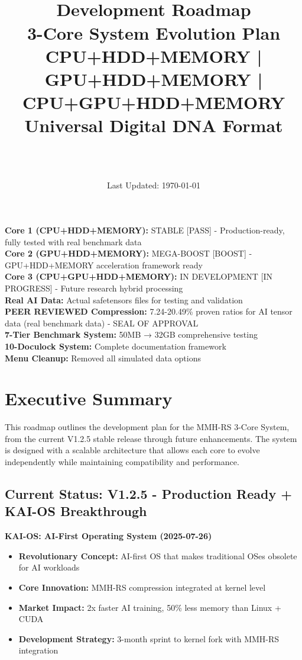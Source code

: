 \documentclass[12pt,a4paper]{article}
\title{\Huge\textbf{\project\ \version}\\[0.5cm]
\Large\textbf{Development Roadmap}\\[0.3cm]
\large 3-Core System Evolution Plan\\[0.5cm]
\large CPU+HDD+MEMORY | GPU+HDD+MEMORY | CPU+GPU+HDD+MEMORY\\[0.3cm]
\large Universal Digital DNA Format}
\author{\Large\authorname\\[0.2cm]\email\\[0.2cm]\github}
\date{\large Last Updated: \today}
\begin{document}
\maketitle
\thispagestyle{empty}

\begin{tcolorbox}[colback=blue!10,colframe=blue!50,title=\textbf{V1.2.5 - 3-Core System - DEVELOPMENT ROADMAP}]
\textbf{Core 1 (CPU+HDD+MEMORY):} STABLE [PASS] - Production-ready, fully tested with real benchmark data\\
\textbf{Core 2 (GPU+HDD+MEMORY):} MEGA-BOOST [BOOST] - GPU+HDD+MEMORY acceleration framework ready\\
\textbf{Core 3 (CPU+GPU+HDD+MEMORY):} IN DEVELOPMENT [IN PROGRESS] - Future research hybrid processing\\
\textbf{Real AI Data:} Actual safetensors files for testing and validation\\
\textbf{PEER REVIEWED Compression:} 7.24-20.49\% proven ratios for AI tensor data (real benchmark data) - \checkmark SEAL OF APPROVAL\\
\textbf{7-Tier Benchmark System:} 50MB → 32GB comprehensive testing\\
\textbf{10-Doculock System:} Complete documentation framework\\
\textbf{Menu Cleanup:} Removed all simulated data options
\end{tcolorbox}

\tableofcontents
\newpage

\section{Executive Summary}

This roadmap outlines the development plan for the MMH-RS 3-Core System, from the current V1.2.5 stable release through future enhancements. The system is designed with a scalable architecture that allows each core to evolve independently while maintaining compatibility and performance.

\subsection{Current Status: V1.2.5 - Production Ready + KAI-OS Breakthrough}

\textbf{KAI-OS: AI-First Operating System (2025-07-26)}
\begin{itemize}
    \item \textbf{Revolutionary Concept:} AI-first OS that makes traditional OSes obsolete for AI workloads
    \item \textbf{Core Innovation:} MMH-RS compression integrated at kernel level
    \item \textbf{Market Impact:} 2x faster AI training, 50\% less memory than Linux + CUDA
    \item \textbf{Development Strategy:} 3-month sprint to kernel fork with MMH-RS integration
\end{itemize}
\end{document}
